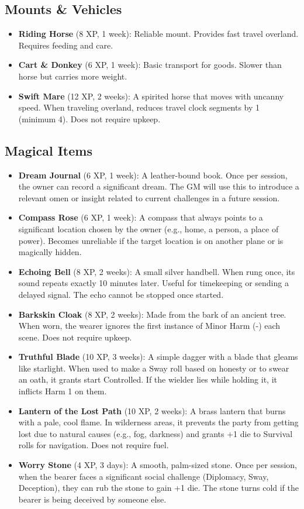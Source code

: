 \documentclass[12pt]{article}
\begin{document}
\subsection*{Mounts \& Vehicles}

\begin{itemize}[leftmargin=*]
  \item \textbf{Riding Horse} (8 XP, 1 week): Reliable mount. Provides fast travel overland. Requires feeding and care.
  \item \textbf{Cart \& Donkey} (6 XP, 1 week): Basic transport for goods. Slower than horse but carries more weight.
  \item \textbf{Swift Mare} (12 XP, 2 weeks): A spirited horse that moves with uncanny speed. When traveling overland, reduces travel clock segments by 1 (minimum 4). Does not require upkeep.
\end{itemize}

\subsection*{Magical Items}

\begin{itemize}[leftmargin=*]
  \item \textbf{Dream Journal} (6 XP, 1 week): A leather-bound book. Once per session, the owner can record a significant dream. The GM will use this to introduce a relevant omen or insight related to current challenges in a future session.
  \item \textbf{Compass Rose} (6 XP, 1 week): A compass that always points to a significant location chosen by the owner (e.g., home, a person, a place of power). Becomes unreliable if the target location is on another plane or is magically hidden.
  \item \textbf{Echoing Bell} (8 XP, 2 weeks): A small silver handbell. When rung once, its sound repeats exactly 10 minutes later. Useful for timekeeping or sending a delayed signal. The echo cannot be stopped once started.
  \item \textbf{Barkskin Cloak} (8 XP, 2 weeks): Made from the bark of an ancient tree. When worn, the wearer ignores the first instance of Minor Harm (-) each scene. Does not require upkeep.
  \item \textbf{Truthful Blade} (10 XP, 3 weeks): A simple dagger with a blade that gleams like starlight. When used to make a Sway roll based on honesty or to swear an oath, it grants start Controlled. If the wielder lies while holding it, it inflicts Harm 1 on them.
  \item \textbf{Lantern of the Lost Path} (10 XP, 2 weeks): A brass lantern that burns with a pale, cool flame. In wilderness areas, it prevents the party from getting lost due to natural causes (e.g., fog, darkness) and grants +1 die to Survival rolls for navigation. Does not require fuel.
  \item \textbf{Worry Stone} (4 XP, 3 days): A smooth, palm-sized stone. Once per session, when the bearer faces a significant social challenge (Diplomacy, Sway, Deception), they can rub the stone to gain +1 die. The stone turns cold if the bearer is being deceived by someone else.
\end{itemize}
\end{document}
